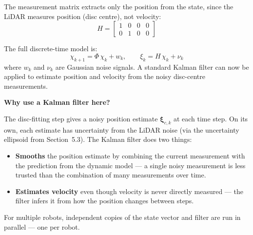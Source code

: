 \documentclass[12pt, a4paper]{article}
\begin{document}
The measurement matrix extracts only the position from the state, since
the LiDAR measures position (disc centre), not velocity:
\[
  H = \begin{bmatrix} 1 & 0 & 0 & 0 \\ 0 & 1 & 0 & 0 \end{bmatrix}
\]

The full discrete-time model is:
\[
  \chi_{k+1} = \Phi\,\chi_k + w_k,
  \qquad
  \xi_k = H\,\chi_k + \nu_k
\]
where $w_k$ and $\nu_k$ are Gaussian noise signals.
A standard Kalman filter can now be applied to estimate position and
velocity from the noisy disc-centre measurements.

\begin{notebox}
  \textbf{Why use a Kalman filter here?}

  The disc-fitting step gives a noisy position estimate
  $\boldsymbol{\xi}_{c,k}$ at each time step.
  On its own, each estimate has uncertainty from the LiDAR noise (via the
  uncertainty ellipsoid from Section~5.3).
  The Kalman filter does two things:
  \begin{itemize}[leftmargin=1.2em,itemsep=2pt]
    \item \textbf{Smooths} the position estimate by combining the current
      measurement with the prediction from the dynamic model --- a single
      noisy measurement is less trusted than the combination of many
      measurements over time.
    \item \textbf{Estimates velocity} even though velocity is never directly
      measured --- the filter infers it from how the position changes between
      steps.
  \end{itemize}
  For multiple robots, independent copies of the state vector and filter
  are run in parallel --- one per robot.
\end{notebox}
\end{document}
